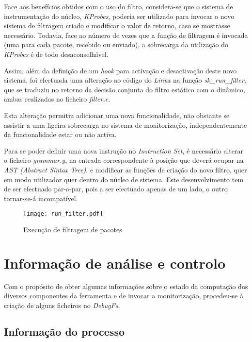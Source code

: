 Face aos benefícios obtidos com o uso do filtro, considera-se que o sistema de instrumentação do núcleo, \textit{KProbes}, poderia ser utilizado para invocar o novo sistema de filtragem criado e modificar o valor de retorno, caso se mostrasse necessário.
Todavia, face ao número de vezes que a função de filtragem é invocada (uma para cada pacote, recebido ou enviado), a sobrecarga da utilização do \textit{KProbes} é de todo desaconselhável.

Assim, além da definição de um \textit{hook} para activação e desactivação deste novo sistema, foi efectuada uma alteração ao código do \textit{Linux} na função \textit{sk\_run\_filter}, que se traduziu no retorno da decisão conjunta do filtro estático com o dinâmico, ambas realizadas no ficheiro \textit{filter.c}.

Esta alteração permitiu adicionar uma nova funcionalidade, não obstante se assistir a uma ligeira sobrecarga no sistema de monitorização, independentemente da funcionalidade estar ou não activa.


Para se poder definir uma nova instrução no \textit{Instruction Set}, é necessário alterar o ficheiro \textit{grammar.y}, na entrada correspondente à posição que deverá ocupar na \textit{AST (Abstract Sintax Tree)}, e modificar as funções de criação do novo filtro, quer em modo utilizador quer dentro do núcleo de sistema.
Este desenvolvimento tem de ser efectuado par-a-par, pois a ser efectuado apenas de um lado, o outro tornar-se-á incompatível.


\begin{figure}[ht]
\centering
\texttt{[image: run\_filter.pdf]}
\caption{Execução de filtragem de pacotes}
\label{fig:run_filter}
\end{figure}

\section{Informação de análise e controlo}

Com o propósito de obter algumas informações sobre o estado da computação dos diversos componentes da ferramenta e de invocar a monitorização, procedeu-se à criação de alguns ficheiros no \textit{DebugFs}.


\subsection{Informação do processo}


